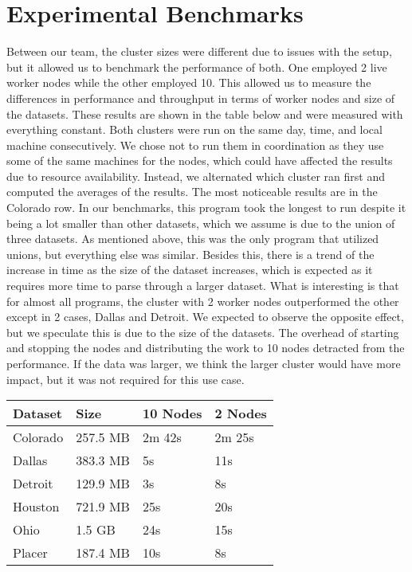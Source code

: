 \documentclass[titlepage]{article}
\begin{document}
\section{Experimental Benchmarks}
Between our team, the cluster sizes were different due to issues with the setup, but it allowed us to benchmark the performance of both. One employed 2 live worker nodes while the other employed 10. This allowed us to measure the differences in performance and throughput in terms of worker nodes and size of the datasets. These results are shown in the table below and were measured with everything constant. Both clusters were run on the same day, time, and local machine consecutively. We chose not to run them in coordination as they use some of the same machines for the nodes, which could have affected the results due to resource availability. Instead, we alternated which cluster ran first and computed the averages of the results. The most noticeable results are in the Colorado row. In our benchmarks, this program took the longest to run despite it being a lot smaller than other datasets, which we assume is due to the union of three datasets. As mentioned above, this was the only program that utilized  unions, but everything else was similar. Besides this, there is a trend of the increase in time as the size of the dataset increases, which is expected as it requires more time to parse through a larger dataset. What is interesting is that for almost all programs, the cluster with 2 worker nodes outperformed the other except in 2 cases, Dallas and Detroit. We expected to observe the opposite effect, but we speculate this is due to the size of the datasets. The overhead of starting and stopping the nodes and distributing the work to 10 nodes detracted from the performance. If the data was larger, we think the larger cluster would have more impact, but it was not required for this use case.

\begin{table}[H]
  \centering
  \begin{tabular}{ |p{2cm}|p{2cm}|p{2cm}| p{2cm}| }
  \hline
    Dataset &Size &10 Nodes &2 Nodes\\
    \hline
      Colorado & 257.5 MB &2m 42s &2m 25s \\
      Dallas & 383.3 MB &5s &11s \\
      Detroit &129.9 MB &3s &8s \\
      Houston &721.9 MB &25s &20s \\
      Ohio &1.5 GB &24s &15s \\
      Placer &187.4 MB &10s &8s \\
    \hline
  \end{tabular}
  \end{table}
\end{document}
